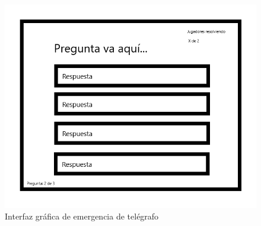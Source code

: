 \begin{itemize}
    \begin{figure}[H]
        \centering
        \includegraphics[width=0.5\linewidth]{images/sabotage_preguntas.png}
        \caption{Interfaz gráfica de emergencia de telégrafo}
        \label{fig:ui_teletransporte}
    \end{figure}
\end{itemize}

